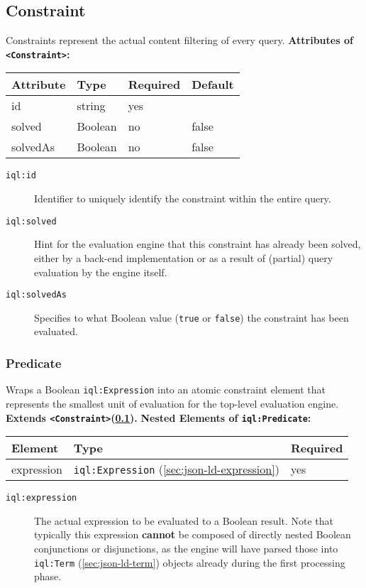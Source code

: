 \documentclass[11pt]{article}
\newcommand{\iqlns}{iql:}
\newcommand{\iqlType}[1]{\texttt{\iqlns#1}}
\newcommand{\iqlBaseType}[1]{\texttt{\textless#1\textgreater}}
\newcommand{\desc}[1]{\noindent#1\newline\medskip}
\newcommand{\extends}[2]{\noindent\textbf{Extends #1(#2).}\newline\medskip}
\newenvironment{attributes}[1]{
\noindent\textbf{Attributes of #1:}\newline\medskip
\begin{tabular}{|p{0.3\textwidth}|p{0.20\textwidth}|p{0.20\textwidth}|p{0.17\textwidth}|}
	\hline
	\textbf{Attribute} & \textbf{Type} & \textbf{Required} & \textbf{Default} \\ 
	\hline
	\hline
}{
\end{tabular}
}
\newcommand{\attribute}[4]{
	#1 & #2 & #3 & #4 \\
	\hline
}
\newenvironment{elements}[1]{
\noindent\textbf{Nested Elements of #1:}\newline\medskip
\begin{tabular}{|p{0.3\textwidth}|p{0.42\textwidth}|p{0.17\textwidth}|}
	\hline
	\textbf{Element} & \textbf{Type} & \textbf{Required} \\ 
	\hline
	\hline
}{
\end{tabular}
}
\newcommand{\element}[3]{
#1 & #2 & #3 \\
\hline
}
\begin{document}
\subsection{Constraint}
\label{sec:json-ld-constraint}
\desc{Constraints represent the actual content filtering of every query.}
\begin{attributes}{\iqlBaseType{Constraint}}
	\attribute{id}{string}{yes}{}
	\attribute{solved}{Boolean}{no}{false}
	\attribute{solvedAs}{Boolean}{no}{false}
\end{attributes}
\begin{description}
	\item[\iqlType{id}] Identifier to uniquely identify the constraint within the entire query.
	\item[\iqlType{solved}] Hint for the evaluation engine that this constraint has already been solved, either by a back-end implementation or as a result of (partial) query evaluation by the engine itself.
	\item[\iqlType{solvedAs}] Specifies to what Boolean value (\texttt{true} or \texttt{false}) the constraint has been evaluated.
\end{description}

\subsubsection{Predicate}
\label{sec:json-ld-predicate}
\desc{Wraps a Boolean \iqlType{Expression} into an atomic constraint element that represents the smallest unit of evaluation for the top-level evaluation engine.}
\extends{\iqlBaseType{Constraint}}{\ref{sec:json-ld-constraint}}
\begin{elements}{\iqlType{Predicate}}
	\element{expression}{\iqlType{Expression} (\ref{sec:json-ld-expression})}{yes}
\end{elements}
\begin{description}
	\item[\iqlType{expression}] The actual expression to be evaluated to a Boolean result. Note that typically this expression \textbf{cannot} be composed of directly nested Boolean conjunctions or disjunctions, as the engine will have parsed those into \iqlType{Term} (\ref{sec:json-ld-term}) objects already during the first processing phase.
\end{description}
\end{document}
